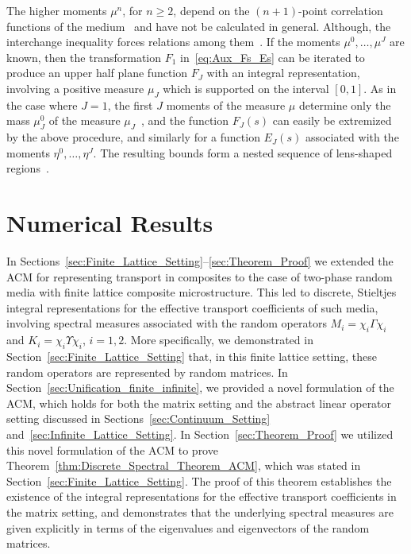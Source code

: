 \documentclass{cmslatex}
\begin{document}
The higher moments $\mu^n$, for $n\geq2$, depend on the $(n+1)$-point
correlation functions of the medium~\cite{Golden:CMP-473} and have not
be calculated in general. Although, the interchange inequality forces
relations among them~\cite{Milton:JAP-5294}. If the moments
$\mu^0,\ldots,\mu^J$ are known, then the transformation $F_1$
in~\eqref{eq:Aux_Fs_Es} can be iterated to produce an upper half plane 
function $F_J$ with an integral representation, involving a positive
measure $\mu_J$ which is supported on the interval $[0,1]$. As in the
case where $J=1$, the first $J$ moments of the measure $\mu$ determine
only the mass $\mu_J^0$ of the measure $\mu_J$~\cite{Golden:JMPS-333}, and
the function $F_J(s)$ can easily be extremized by the above procedure,
and similarly for a function $E_J(s)$ associated with the moments
$\eta^0,\ldots,\eta^J$. The resulting bounds form a nested sequence of 
lens-shaped regions~\cite{Golden:JMPS-333}.




\section{Numerical Results}\label{sec:Numerical_Results}
%
In Sections~\ref{sec:Finite_Lattice_Setting}--\ref{sec:Theorem_Proof}
we extended the ACM for representing transport in composites
to the case of two-phase random media with finite lattice composite 
microstructure. This led to discrete, Stieltjes integral
representations for the effective transport coefficients of such
media, involving spectral measures associated with the random
operators $M_i=\chi_i\Gamma\chi_i$ and $K_i=\chi_i\Upsilon\chi_i$, $i=1,2$. More specifically,
we demonstrated in Section~\ref{sec:Finite_Lattice_Setting} that, in
this finite lattice setting, these random operators are represented by
random matrices. In Section~\ref{sec:Unification_finite_infinite}, we
provided a novel formulation of the ACM, which holds for both the
matrix setting and the abstract linear operator setting discussed in
Sections~\ref{sec:Continuum_Setting}
and~\ref{sec:Infinite_Lattice_Setting}. In
Section~\ref{sec:Theorem_Proof} 
we utilized this novel formulation of the ACM to prove
Theorem~\ref{thm:Discrete_Spectral_Theorem_ACM}, which was stated in
Section~\ref{sec:Finite_Lattice_Setting}. The proof of this theorem
establishes the existence of the integral representations for the
effective transport coefficients in the matrix setting, and
demonstrates that the underlying spectral measures are given
explicitly in terms of the eigenvalues and eigenvectors of the random
matrices. 
\end{document}
